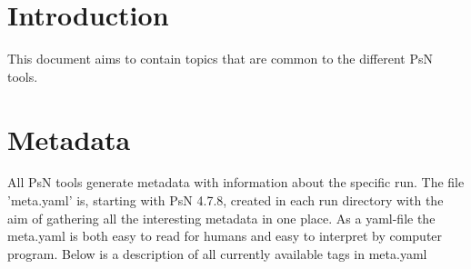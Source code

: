 

\usepackage{tabularx}
\usepackage{hyperref}



	
	
	\maketitle
	\newcommand{\guidetoolname}{<toolname>}
	\tableofcontents
	\newpage
	
	\section{Introduction}
	This document aims to contain topics that are common to the different PsN tools.
	
	\section{Metadata}
	All PsN tools generate metadata with information about the specific run. The file 'meta.yaml' is, starting with PsN 4.7.8, created in each run directory with the aim of gathering all the interesting metadata in one place. As a yaml-file the meta.yaml is both easy to read for humans and easy to interpret by computer program. Below is a description of all currently available tags in meta.yaml
	
